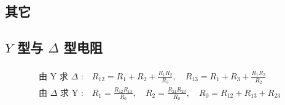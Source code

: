 \documentclass[a4paper]{article}  %
\theoremstyle{MyLineTheoremStyle} %
\theoremstyle{MyBlockTheoremStyle} %
\theoremstyle{MySubsubsectionStyle} %
\begin{document}
\begin{multicols*}{4}
\section{其它}

\subsection{$Y$ 型与 $\Delta$ 型电阻}
\begin{gather}
    \begin{matrix}
        \text{由 Y 求 $\Delta$ :}\quad R_{12}= R_1 + R_2 + \frac{R_1R_2}{R_3}, \quad
        R_{13}=R_1 + R_3 + \frac{R_1R_3}{R_2} \\
        \text{由 $\Delta$ 求 Y :}\quad R_{1}=\frac{R_{12}R_{13}}{R_0}, \quad
        R_{2}=\frac{R_{21}R_{23}}{R_0}, \quad
        R_0 = R_{12}+R_{13}+R_{23} 
    \end{matrix}
\end{gather}


\end{multicols*}
\end{document}
